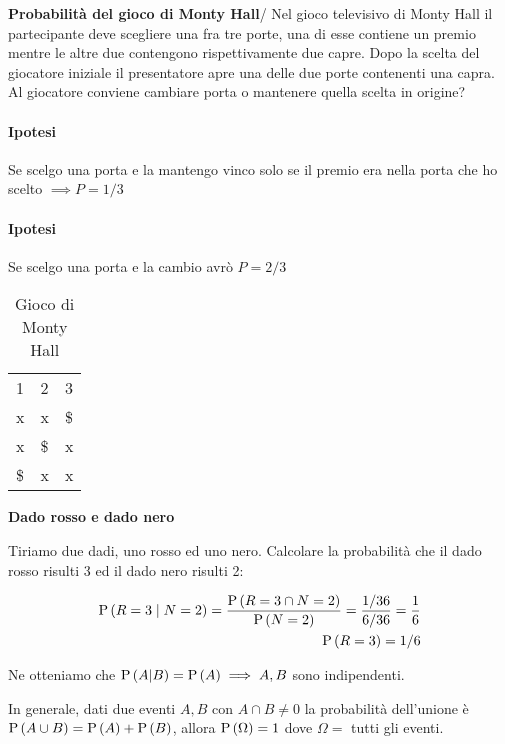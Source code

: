\begin{exrc}
	\textbf{Probabilità del gioco di Monty Hall}/
	Nel gioco televisivo di Monty Hall il partecipante deve scegliere una fra tre porte, una di esse contiene un premio mentre le altre due contengono rispettivamente due capre. Dopo la scelta del giocatore iniziale il presentatore apre una delle due porte contenenti una capra. Al giocatore conviene cambiare porta o mantenere quella scelta in origine?
	
	\paragraph{Ipotesi} Se scelgo una porta e la mantengo vinco solo se il premio era nella porta che ho scelto $ \implies P = 1/3 $
	
	\paragraph{Ipotesi} Se scelgo una porta e la cambio avrò $ P = 2/3 $
	\begin{table}[H]
		\centering
		\caption{Gioco di Monty Hall}
		\begin{tabular}{lll}
			1  & 2  & 3  \\
			x  & x  & \$ \\
			x  & \$ & x  \\
			\$ & x  & x 
		\end{tabular}
	\end{table}
\end{exrc}
 
\begin{exrc}
	\textbf{Dado rosso e dado nero}
	
	Tiriamo due dadi, uno rosso ed uno nero. Calcolare la probabilità che il dado rosso risulti 3 ed il dado nero risulti 2:
	
	\begin{equation*}
		\begin{aligned}
			\text{P}\left(R=3 \mid N=2\right) = \dfrac{\text{P}\left(R=3 \cap N=2\right)}{\text{P}\left(N=2\right)} = 	\dfrac{1/36}{6/36} = \dfrac{1}{6} \\
			\text{P}\left(R=3\right) = 1/6
		\end{aligned}
	\end{equation*}
	
	Ne otteniamo che $ \text{P}\left(A|B\right) = \text{P}\left(A\right) \implies A, B $ sono indipendenti.
	
	In generale, dati due eventi $ A, B $ con $ A \cap B \neq 0 $ la probabilità dell'unione è $ \text{P}\left(A \cup B\right) = \text{P}\left(A\right) + \text{P}\left(B\right) $, allora $ \text{P}\left(\Omega\right) = 1 $ dove $ \Omega = $ tutti gli eventi.
\end{exrc}

